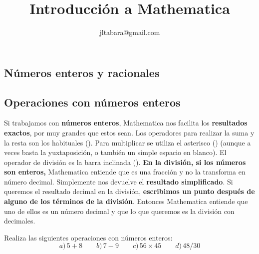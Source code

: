 \documentclass[a4paper,10pt, draft]{article}
\author{jltabara@gmail.com}
\title{Introducción a Mathematica}
\date{}
\newcommand{\com}[1]{\textbf{\color{blue}{#1}}}
\newenvironment{capitulo}{\begin{tcolorbox}[colback=red!5!white,colframe=red!75!black]}{\end{tcolorbox}\bigskip}
\newenvironment{ejer}{\begin{tcolorbox}[center title, title=Ejercicios,
fonttitle=\sffamily\bfseries,colback=blue!5,colframe=orange]}{\end{tcolorbox}}
\begin{document}
\begin{capitulo}

\vspace{-1cm}
\maketitle

\end{capitulo}

\vspace{-0.5 cm}

\thispagestyle{empty}

\tableofcontents

\newpage

\begin{capitulo}

\section{Números enteros y racionales}

\end{capitulo}



\subsection{Operaciones con números enteros}

Si trabajamos con \textbf{números enteros}, Mathematica nos facilita los \textbf{resultados exactos}, por muy grandes que estos sean. Los operadores para realizar la suma y la resta son los habituales \mbox{(\com{ +,- })}. Para multiplicar se utiliza el asterisco (\com{ * }) (aunque a veces basta la yuxtaposición, o también un simple espacio en blanco). El operador de división es la barra inclinada (\com{ / }). \textbf{En la división, si los números son enteros,} Mathematica entiende que es una fracción y no la transforma en número decimal. Simplemente  nos devuelve el \textbf{resultado simplificado}. Si queremos el resultado decimal en la división, \textbf{escribimos un punto después de alguno de los términos de la división}. Entonces Mathematica entiende que uno de ellos es un número decimal y que lo que queremos es la división con decimales.

\begin{ejer}

Realiza las siguientes operaciones con números enteros:
 $$
  a)\,5+8 \qquad  b)\,7-9 \qquad  c)\,56 \times 45 \qquad  d)\,48/ 30
  $$
 
\end{ejer}
\end{document}
